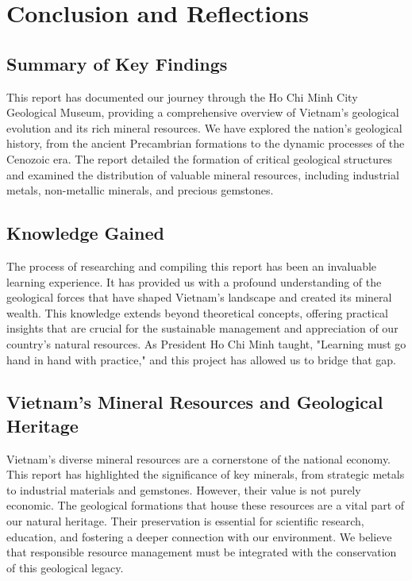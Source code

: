 \section{Conclusion and Reflections}
\label{sec:conclusion}

\subsection{Summary of Key Findings}
\label{sec:summary_of_key_findings}
This report has documented our journey through the Ho Chi Minh City Geological Museum, providing a comprehensive overview of Vietnam's geological evolution and its rich mineral resources. We have explored the nation's geological history, from the ancient Precambrian formations to the dynamic processes of the Cenozoic era. The report detailed the formation of critical geological structures and examined the distribution of valuable mineral resources, including industrial metals, non-metallic minerals, and precious gemstones.

\subsection{Knowledge Gained}
\label{sec:knowledge_gained}
The process of researching and compiling this report has been an invaluable learning experience. It has provided us with a profound understanding of the geological forces that have shaped Vietnam's landscape and created its mineral wealth. This knowledge extends beyond theoretical concepts, offering practical insights that are crucial for the sustainable management and appreciation of our country's natural resources. As President Ho Chi Minh taught, "Learning must go hand in hand with practice," and this project has allowed us to bridge that gap.

\subsection{Vietnam's Mineral Resources and Geological Heritage}
\label{sec:vietnams_mineral_resources_heritage}
Vietnam's diverse mineral resources are a cornerstone of the national economy. This report has highlighted the significance of key minerals, from strategic metals to industrial materials and gemstones. However, their value is not purely economic. The geological formations that house these resources are a vital part of our natural heritage. Their preservation is essential for scientific research, education, and fostering a deeper connection with our environment. We believe that responsible resource management must be integrated with the conservation of this geological legacy.


